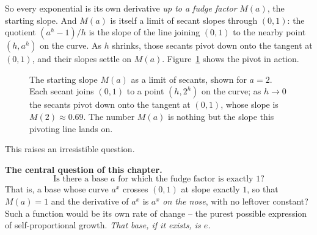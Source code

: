 So every exponential is its own derivative \emph{up to a fudge factor} $M(a)$, the starting slope. And $M(a)$ is itself a limit of secant slopes through $(0,1)$: the quotient $(a^h-1)/h$ is the slope of the line joining $(0,1)$ to the nearby point $(h,a^h)$ on the curve. As $h$ shrinks, those secants pivot down onto the tangent at $(0,1)$, and their slopes settle on $M(a)$. Figure~\ref{ch03:fig-secant} shows the pivot in action.

\begin{figure}[H]
\centering
{}
\caption{The starting slope $M(a)$ as a limit of secants, shown for $a=2$. Each secant joins $(0,1)$ to a point $(h,2^h)$ on the curve; as $h\to 0$ the secants pivot down onto the tangent at $(0,1)$, whose slope is $M(2)\approx 0.69$. The number $M(a)$ is nothing but the slope this pivoting line lands on.}
\label{ch03:fig-secant}
\end{figure}

This raises an irresistible question.

\begin{focusbox}
\textbf{The central question of this chapter.}
\[
\text{Is there a base } a \text{ for which the fudge factor is exactly } 1?
\]
That is, a base whose curve $a^x$ crosses $(0,1)$ at slope exactly $1$, so that $M(a)=1$ and the derivative of $a^x$ is $a^x$ \emph{on the nose}, with no leftover constant? Such a function would be its own rate of change -- the purest possible expression of self-proportional growth. \emph{That base, if it exists, is $e$.}
\end{focusbox}

